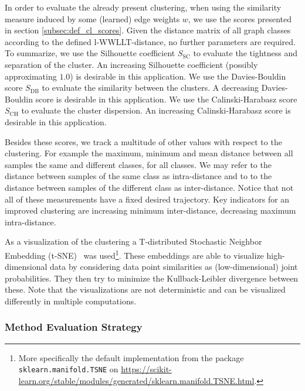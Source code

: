 		In order to evaluate the already present clustering, when using the similarity measure induced by some (learned) edge weights $w$, we use the scores presented in section \ref{subsec:def_cl_scores}.
		Given the distance matrix of all graph classes according to the defined l-WWLLT-distance, no further parameters are required.
		To summarize, we use the Silhouette coefficient $S_{\text{SC}}$ to evaluate the tightness and separation of the cluster.
		An increasing Silhouette coefficient (possibly approximating $1.0$) is desirable in this application.
		We use the Davies-Bouldin score $S_{\text{DB}}$ to evaluate the similarity between the clusters.
		A decreasing Davies-Bouldin score is desirable in this application.
		We use the Calinski-Harabasz score $S_{\text{CH}}$ to evaluate the cluster dispersion.
		An increasing Calinski-Harabasz score is desirable in this application.
		
		Besides these scores, we track a multitude of other values with respect to the clustering.
		For example the maximum, minimum and mean distance between all samples the same and different classes, for all classes.
		We may refer to the distance between samples of the same class as intra-distance and to to the distance between samples of the different class as inter-distance.
		Notice that not all of these measurements have a fixed desired trajectory.
		Key indicators for an improved clustering are increasing minimum inter-distance, decreasing maximum intra-distance.
		
		As a visualization of the clustering a T-distributed Stochastic Neighbor Embedding (t-SNE)~\cite{2008_Maaten_CONF} was used\footnote{More specifically the default implementation from the package \texttt{sklearn.manifold.TSNE} on \url{https://scikit-learn.org/stable/modules/generated/sklearn.manifold.TSNE.html}.}. 
		These embeddings are able to visualize high-dimensional data by considering data point similarities as (low-dimensional) joint probabilities.
		They then try to minimize the Kullback-Leibler divergence between these.
		Note that the visualizations are not deterministic and can be visualized differently in multiple computations.
						
	\subsubsection{Method Evaluation Strategy} \label{subsec:method_eval_strategy}
	

